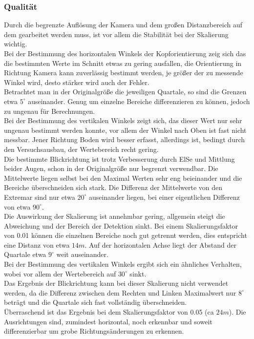\subsubsection{Qualität}
Durch die begrenzte Auflösung der Kamera und dem großen Distanzbereich auf dem gearbeitet werden muss, ist vor allem die Stabilität bei der Skalierung wichtig.\\
Bei der Bestimmung des horizontalen Winkels der Kopforientierung zeig sich das die bestimmten Werte im Schnitt etwas zu gering ausfallen, die Orientierung in Richtung Kamera kann zuverlässig bestimmt werden, je größer der zu messende Winkel wird, desto  stärker wird auch der Fehler.\\
Betrachtet man in der Originalgröße die jeweiligen Quartale, so sind die Grenzen etwa $5^\circ$ auseinander. Genug um einzelne Bereiche differenzieren zu können, jedoch zu ungenau für Berechnungen.\\
Bei der Bestimmung des vertikalen Winkels zeigt sich, das dieser Wert nur sehr ungenau bestimmt werden konnte, vor allem der Winkel nach Oben ist fast nicht messbar. Jener Richtung Boden wird besser erfasst, allerdings ist, bedingt durch den Versuchsausbau, der Wertebereich recht gering.\\
Die bestimmte Blickrichtung ist trotz Verbesserung durch ElSe und Mittlung beider Augen, schon in der Originalgröße nur begrenzt verwendbar. Die Mittelwerte liegen selbst bei den Maximal Werten sehr eng beieinander und die Bereiche überschneiden sich stark. Die Differenz der Mittelwerte von den Extremar sind nur etwa $20^\circ$ auseinander liegen, bei einer eigentlichen Differenz von etwa $90^\circ$.\\
Die Auswirkung der Skalierung ist annehmbar gering, allgemein steigt die Abweichung und der Bereich der Detektion sinkt. Bei einem Skalierungsfaktor von 0.01 können die einzelnen Bereiche noch gut getrennt werden, dies entspricht eine Distanz von etwa $14m$. Auf der horizontalen Achse liegt der Abstand der Quartale etwa $9^\circ$ weit auseinander.\\
Bei der Bestimmung des vertikalen Winkels ergibt sich ein ähnliches Verhalten, wobei vor allem der Wertebereich auf $30^\circ$ sinkt.\\
Das Ergebnis der Blickrichtung kann  bei dieser Skalierung nicht verwendet werden, da die Differenz zwischen dem Rechten und Linken Maximalwert nur $8^\circ$ beträgt und die Quartale sich fast vollständig überschneiden.\\
Überraschend ist das Ergebnis bei dem Skalierungsfaktor von 0.05 (ca $24m$). Die Ausrichtungen sind, zumindest horizontal, noch erkennbar und soweit differenzierbar um grobe Richtungsänderungen zu erkennen.
